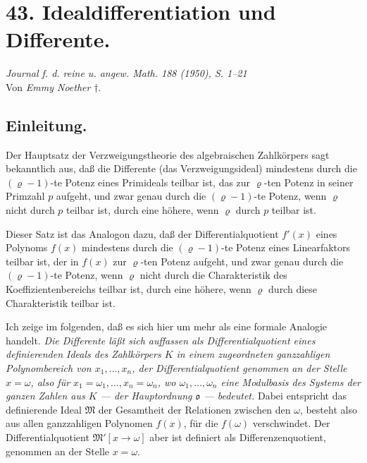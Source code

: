 \section*{43. Idealdifferentiation und Differente.}

\begin{center}
\emph{Journal f. d. reine u. angew. Math. 188 (1950), S. 1--21}\\[0.75ex]
Von \emph{Emmy Noether} \(\dagger\).
\end{center}


\subsection*{Einleitung.}

Der Hauptsatz der Verzweigungstheorie des algebraischen Zahlkörpers sagt bekanntlich aus, daß die Differente (das Verzweigungsideal) mindestens durch die $(\varrho-1)$-te Potenz eines Primideals teilbar ist, das zur $\varrho$-ten Potenz in seiner Primzahl $p$ aufgeht, und zwar genau durch die $(\varrho-1)$-te Potenz, wenn $\varrho$ nicht durch $p$ teilbar ist, durch eine höhere, wenn $\varrho$ durch $p$ teilbar ist.

Dieser Satz ist das Analogon dazu, daß der Differentialquotient $f'(x)$ eines Polynoms $f(x)$ mindestens durch die $(\varrho-1)$-te Potenz eines Linearfaktors teilbar ist, der in $f(x)$ zur $\varrho$-ten Potenz aufgeht, und zwar genau durch die $(\varrho-1)$-te Potenz, wenn $\varrho$ nicht durch die Charakteristik des Koeffizientenbereichs teilbar ist, durch eine höhere, wenn $\varrho$ durch diese Charakteristik teilbar ist.

Ich zeige im folgenden, daß es sich hier um mehr als eine formale Analogie handelt. \emph{Die Differente läßt sich auffassen als Differentialquotient eines definierenden Ideals des Zahlkörpers $K$ in einem zugeordneten ganzzahligen Polynombereich von $x_1,\ldots,x_n$, der Differentialquotient genommen an der Stelle $x=\omega$, also für $x_1=\omega_1,\ldots,x_n=\omega_n$, wo $\omega_1,\ldots,\omega_n$ eine Modulbasis des Systems der ganzen Zahlen aus $K$ --- der Hauptordnung $\mathfrak o$ --- bedeutet.} Dabei entspricht das definierende Ideal $\mathfrak M$ der Gesamtheit der Relationen zwischen den $\omega$, besteht also aus allen ganzzahligen Polynomen $f(x)$, für die $f(\omega)$ verschwindet. Der Differentialquotient $\mathfrak M'[x\to\omega]$ aber ist definiert als Differenzenquotient, genommen an der Stelle $x=\omega$.

